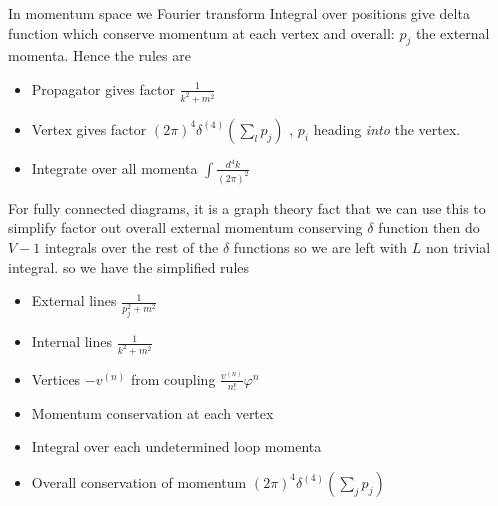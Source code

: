 \documentclass{article}
\begin{document}
In momentum space we Fourier transform 
Integral over positions give delta function which conserve momentum at each vertex and overall:
$p_j$ the external momenta. Hence the rules are
\begin{itemize}
    \item Propagator gives factor $\frac{1}{k^2+m^2}$
    \item Vertex gives factor $(2\pi)^4 \delta^{(4)}(\sum_l p_j)$ , $p_i$ heading \emph{into} the vertex. 
    \item Integrate over all momenta $\int \frac{d^4 k}{(2\pi)^2}$
\end{itemize}
For fully connected diagrams, it is a graph theory fact that 
we can use this to simplify 
\eq{
\int \left[ \prod_{i=1}^I \frac{d^4 k_i}{(2\pi)^4}\right] \left[ \prod_{v=1}^V (2\pi)^4 \delta^{(4)}(\sum_l p_j)\right]
}
factor out overall external momentum conserving $\delta$ function then do $V-1$ integrals over the rest of the $\delta$ functions so we are left with $L$ non trivial integral. 
so we have the simplified rules 
\begin{itemize}
    \item External lines $\frac{1}{p_j^2+m^2}$
    \item Internal lines $\frac{1}{k^2+m^2}$
    \item Vertices  $-v^{(n)}$ from coupling $\frac{v^{(n)}}{n!}\varphi^n$
    \item Momentum conservation at each vertex 
    \item Integral over each undetermined loop momenta 
    \item Overall conservation of momentum $(2\pi)^4 \delta^{(4)}(\sum_j p_j)$
\end{itemize}

\end{document}
